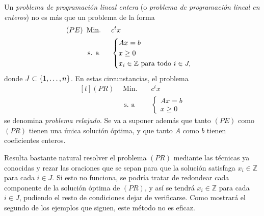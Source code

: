 \documentclass[11pt]{report}
\theoremstyle{mytheorem}
\theoremstyle{mydefinition}
\theoremstyle{myexample}
\newcommand{\Z}{\mathbb Z}
\begin{document}
Un {\textit{problema de programación lineal entera}} (o {\textit{problema de programación lineal en enteros}}) no es más que un problema de la forma
\[\begin{aligned}[t]
(PE)\ \, &\text{Min. } && c^tx \\
& \, \text{s. a} &&\begin{cases}
Ax=b  \\
x \geq 0 \\
x_i \in \Z \textup{ para todo } i \in J,
\end{cases}
\end{aligned}\]
donde $J \subset \{1,\mathellipsis,n\}$. En estas circunstancias, el problema
\[\begin{aligned}[t]
(PR)\ \, &\text{Min. } && c^tx \\
& \, \text{s. a} &&\begin{cases}
Ax=b  \\
x \geq 0
\end{cases}
\end{aligned}\]
se denomina {\textit{problema relajado}}. Se va a suponer además que tanto $(PE)$ como $(PR)$ tienen una única solución óptima, y que tanto $A$ como $b$ tienen coeficientes enteros.



Resulta bastante natural resolver el problema $(PR)$ mediante las técnicas ya conocidas y rezar las oraciones que se sepan para que la solución satisfaga $x_i \in \Z$ para cada $i \in J$. Si esto no funciona, se podría tratar de redondear cada componente de la solución óptima de $(PR)$, y así se tendrá $x_i \in \Z$ para cada $i \in J$, pudiendo el resto de condiciones dejar de verificarse. Como mostrará el segundo de los ejemplos que siguen, este método no es eficaz.
\end{document}
